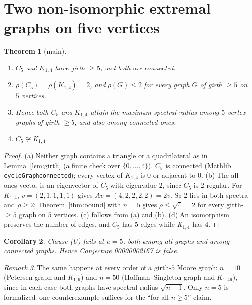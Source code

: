 \documentclass[11pt]{article}
\newtheorem{theorem}{Theorem}
\newtheorem{corollary}[theorem]{Corollary}
\theoremstyle{definition}
\theoremstyle{remark}
\newtheorem{remark}[theorem]{Remark}
\renewcommand{\_}{\oldus\allowbreak}
\begin{document}
\section{Two non-isomorphic extremal graphs on five vertices}

\begin{theorem}[main]\label{thm:main}
\begin{enumerate}[label=(\alph*)]
  \item $C_5$ and $K_{1,4}$ have girth $\ge5$, and both are connected.
  \item $\rho(C_5)=\rho(K_{1,4})=2$, and $\rho(G)\le2$ for every graph $G$ of girth $\ge5$ on $5$ vertices.
  \item Hence both $C_5$ and $K_{1,4}$ attain the maximum spectral radius among $5$-vertex graphs of girth
        $\ge5$, and also among connected ones.
  \item $C_5\not\cong K_{1,4}$.
\end{enumerate}
\end{theorem}

\begin{proof}
(a) Neither graph contains a triangle or a quadrilateral as in Lemma~\ref{lem:girth} (a finite check over
$\{0,\dots,4\}$). $C_5$ is connected (Mathlib \texttt{cycleGraph\_connected}); every vertex of $K_{1,4}$ is
$0$ or adjacent to $0$. (b) The all-ones vector is an eigenvector of $C_5$ with eigenvalue $2$, since $C_5$
is $2$-regular. For $K_{1,4}$, $v=(2,1,1,1,1)$ gives $Av=(4,2,2,2,2)=2v$. So $2$ lies in both spectra and
$\rho\ge2$; Theorem~\ref{thm:bound} with $n=5$ gives $\rho\le\sqrt4=2$ for every girth-$\ge5$ graph on
$5$ vertices. (c) follows from (a) and (b). (d) An isomorphism preserves the number of edges, and $C_5$ has
$5$ edges while $K_{1,4}$ has $4$.
\end{proof}

\begin{corollary}
Clause (U) fails at $n=5$, both among all graphs and among connected graphs. Hence Conjecture 00000002167 is
false.
\end{corollary}

\begin{remark}
The same happens at every order of a girth-$5$ Moore graph: $n=10$ (Petersen graph and $K_{1,9}$) and
$n=50$ (Hoffman--Singleton graph and $K_{1,49}$), since in each case both graphs have spectral radius
$\sqrt{n-1}$. Only $n=5$ is formalized; one counterexample suffices for the ``for all $n\ge5$'' claim.
\end{remark}
\end{document}
